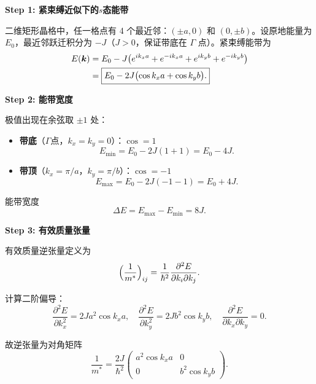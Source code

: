 \begin{derivationbox}[标准解题过程]
\textbf{Step 1: 紧束缚近似下的$s$态能带}

二维矩形晶格中，任一格点有 4 个最近邻：$(\pm a,0)$ 和 $(0,\pm b)$。设原地能量为 $E_0$，最近邻跃迁积分为 $-J$（$J>0$，保证带底在 $\Gamma$ 点）。紧束缚能带为
\begin{align}
E(\bm{k})&=E_0-J\bigl(e^{ik_xa}+e^{-ik_xa}+e^{ik_yb}+e^{-ik_yb}\bigr) \notag\\
&=\boxed{E_0-2J\bigl(\cos k_xa+\cos k_yb\bigr).}
\end{align}

\textbf{Step 2: 能带宽度}

极值出现在余弦取 $\pm1$ 处：
\begin{itemize}
    \item \textbf{带底}（$\Gamma$点，$k_x=k_y=0$）：$\cos=1$
    \begin{equation}
    E_{\min}=E_0-2J(1+1)=E_0-4J.
    \end{equation}
    \item \textbf{带顶}（$k_x=\pi/a$，$k_y=\pi/b$）：$\cos=-1$
    \begin{equation}
    E_{\max}=E_0-2J(-1-1)=E_0+4J.
    \end{equation}
\end{itemize}
能带宽度
\begin{equation}
\boxed{\Delta E=E_{\max}-E_{\min}=8J.}
\end{equation}

\textbf{Step 3: 有效质量张量}

有效质量逆张量定义为
\begin{equation}
\Bigl(\frac{1}{m^*}\Bigr)_{ij}=\frac{1}{\hbar^2}\frac{\partial^2E}{\partial k_i\partial k_j}.
\end{equation}

计算二阶偏导：
\begin{equation}
\frac{\partial^2E}{\partial k_x^2}=2Ja^2\cos k_xa,\quad
\frac{\partial^2E}{\partial k_y^2}=2Jb^2\cos k_yb,\quad
\frac{\partial^2E}{\partial k_x\partial k_y}=0.
\end{equation}

故逆张量为对角矩阵
\begin{equation}
\frac{1}{m^*}=\frac{2J}{\hbar^2}
\begin{pmatrix}
a^2\cos k_xa & 0 \\[4pt]
0 & b^2\cos k_yb
\end{pmatrix}.
\end{equation}


\end{derivationbox}
